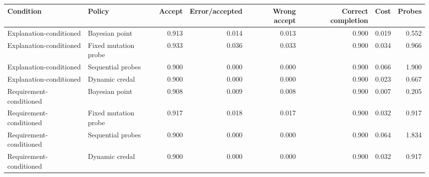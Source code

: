 \begin{tabular}{@{}llrrrrrr@{}}
\toprule
Condition & Policy & Accept & Error/accepted & Wrong accept & Correct completion & Cost & Probes\\
\midrule
Explanation-conditioned & Bayesian point & 0.913 & 0.014 & 0.013 & 0.900 & 0.019 & 0.552\\
Explanation-conditioned & Fixed mutation probe & 0.933 & 0.036 & 0.033 & 0.900 & 0.034 & 0.966\\
Explanation-conditioned & Sequential probes & 0.900 & 0.000 & 0.000 & 0.900 & 0.066 & 1.900\\
Explanation-conditioned & Dynamic credal & 0.900 & 0.000 & 0.000 & 0.900 & 0.023 & 0.667\\
\midrule
Requirement-conditioned & Bayesian point & 0.908 & 0.009 & 0.008 & 0.900 & 0.007 & 0.205\\
Requirement-conditioned & Fixed mutation probe & 0.917 & 0.018 & 0.017 & 0.900 & 0.032 & 0.917\\
Requirement-conditioned & Sequential probes & 0.900 & 0.000 & 0.000 & 0.900 & 0.064 & 1.834\\
Requirement-conditioned & Dynamic credal & 0.900 & 0.000 & 0.000 & 0.900 & 0.032 & 0.917\\
\bottomrule
\end{tabular}
